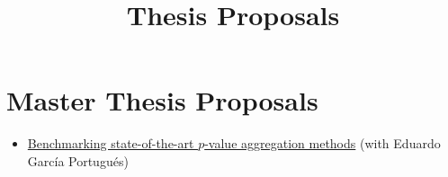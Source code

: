\title{Thesis Proposals}

\section*{Master Thesis Proposals}

\begin{itemize}
  \item \href{/thesis/pcct.pdf}{Benchmarking state-of-the-art $p$-value aggregation methods} (with Eduardo García Portugués)
\end{itemize}
